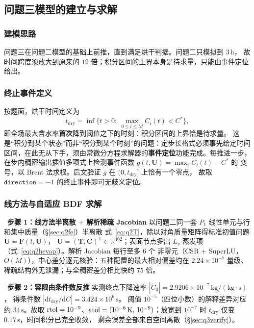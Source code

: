 \documentclass[withoutpreface,bwprint]{cumcmthesis} %
\begin{document}
\subsection{问题三模型的建立与求解}
\label{sec:q3}

\subsubsection{建模思路}
\label{sec:q3model}

问题三在问题二模型的基础上前推，直到满足烘干判据。问题二只模拟到 $3\,\mathrm{h}$，
故时间跨度须放大到原来的 $19$ 倍；积分区间的上界本身是待求量，只能由事件定位给出。

\subsubsection{终止事件定义}

按题面，烘干时间定义为
\begin{equation}
\label{eq:q3tdry}
t_{\mathrm{dry}}=\inf\bigl\{t>0:\ \max_{0\le i\le M}C_i(t)<C^{*}\bigr\},
\end{equation}
即全场最大含水率\textbf{首次}降到阈值之下的时刻：积分区间的上界恰是待求量。
这是``积分到某个状态''而非``积分到某个时刻''的问题：定步长格式必须事先给定时间
区间，在此无从下手，须由常微分方程求解器的\textbf{事件定位}功能完成。每推进一步，
在步内稠密输出插值多项式上检测事件函数 $g(t,\mathbf{U})=\max_iC_i(t)-C^{*}$ 的
变号，以 Brent 法求根。后文验证 $g$ 在 $(0,t_{\mathrm{dry}}]$ 上恰有一个零点，
故取 $\texttt{direction}=-1$ 的终止事件即可无歧义定位。

\subsubsection{线方法与自适应 BDF 求解}
\label{sec:q3solve}

\noindent{}\ \textbf{步骤 1：线方法半离散 $+$ 解析稀疏 Jacobian}
以问题二同一套 $P_1$ 线性单元与行和集中质量（\S\ref{sec:q2fe}）半离散
式~\eqref{eq:q2T}，除以对角质量矩阵得标准初值问题 $\dot{\mathbf{U}}=\mathbf{F}(t,\mathbf{U})$，
$\mathbf{U}=(\mathbf{T},\mathbf{C})^{\mathsf T}\in\mathbb{R}^{402}$；表面节点多出
$L_v$ 蒸发项（式~\eqref{eq:q2hevap}）。解析 Jacobian 每行至多 $6$ 个
非零元（CSR $+$ SuperLU，$O(M)$），中心差分逐元核验：五种配置的最大相对偏差均在
$2.24\times10^{-7}$ 量级、稀疏结构外无泄漏；与全稠密差分相比快约 $75$ 倍。

\noindent{}\ \textbf{步骤 2：容限由条件数反推}
实测终点下降速率 $|\dot C_0|=2.9206\times10^{-7}\,\mathrm{kg/(kg\cdot s)}$，
得条件数 $|\mathrm{d}t_{\mathrm{dry}}/\mathrm{d}C|=3.424\times10^{6}\,\mathrm{s}$。
阈值 $10^{-5}$（四位小数）的解释差异对应约 $34\,\mathrm{s}$。故取
${\rm rtol}=10^{-9}$、${\rm atol}=(10^{-6}\,\mathrm{K},\,10^{-9})$；放宽到
$10^{-7}$ 时 $t_{\mathrm{dry}}$ 仅变 $0.17\,\mathrm{s}$，时间积分已完全收敛，
剩余误差全部来自空间离散（\S\ref{sec:q3verify}）。
\end{document}
